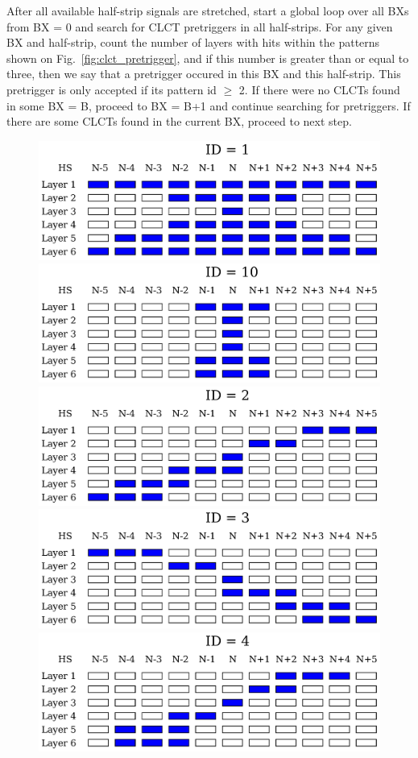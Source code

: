 After all available half-strip signals are stretched, start a global loop over all BXs from BX = 0 and search for CLCT pretriggers in all half-strips. For any given BX and half-strip, count the number of layers with hits within the patterns shown on Fig.~\ref{fig:clct_pretrigger}, and if this number is greater than or equal to three, then we say that a pretrigger occured in this BX and this half-strip. This pretrigger is only accepted if its pattern id $\geq$ 2. If there were no CLCTs found in some BX = B, proceed to BX = B+1 and continue searching for pretriggers. If there are some CLCTs found in the current BX, proceed to next step.

\begin{figure}[tbh]
        \begin{center}
                \includegraphics[width=0.48\linewidth]{figures/clct_pattern_01.pdf}
                \includegraphics[width=0.48\linewidth]{figures/clct_pattern_10.pdf}\\
                \includegraphics[width=0.48\linewidth]{figures/clct_pattern_02.pdf}
                \includegraphics[width=0.48\linewidth]{figures/clct_pattern_03.pdf}\\
                \includegraphics[width=0.48\linewidth]{figures/clct_pattern_04.pdf}

\end{center}
\end{figure}
